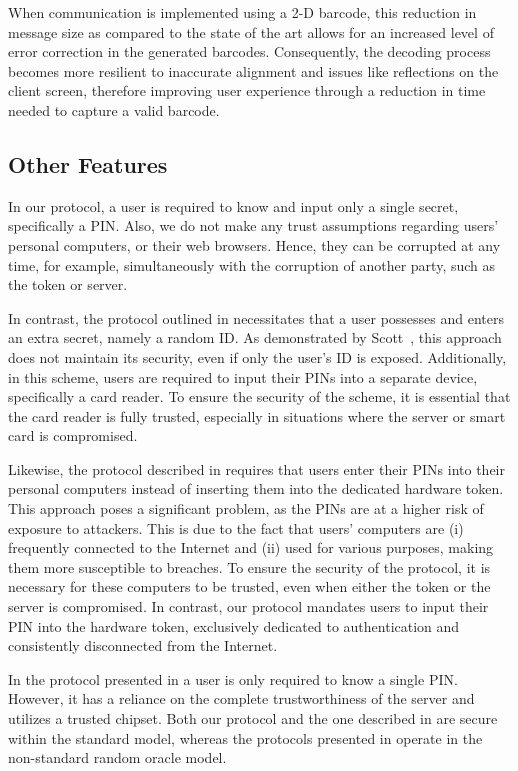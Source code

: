 When communication is implemented using a 2-D barcode, this reduction in message size as compared to the state of the art allows for an increased level of error correction in the generated barcodes.
Consequently, the decoding process becomes more resilient to inaccurate alignment and issues like reflections on the client screen, therefore improving user experience through a reduction in time needed to capture a valid barcode.


\subsection{Other Features}


In our protocol, a user is required to know and input only a single secret, specifically a PIN. Also, we do not make any trust assumptions regarding users' personal computers, or their web browsers. Hence, they can be corrupted at any time,  for example, simultaneously with the corruption of another party, such as the token or server. 
 
 In contrast, the protocol outlined in \cite{WangW18} necessitates that a user possesses and enters an extra secret, namely a random ID.  As demonstrated by Scott~\cite{Scott12a}, this approach does not maintain its security, even if only the user's ID is exposed. Additionally, in this scheme, users are required to input their PINs into a separate device, specifically a card reader. To ensure the security of the scheme, it is essential that the card reader is fully trusted, especially in situations where the server or smart card is compromised.
 
 
  Likewise, the protocol described in  \cite{JareckiJKSS21} requires that users enter their PINs into their personal computers instead of inserting them into the dedicated hardware token. This approach poses a significant problem, as the PINs are at a higher risk of exposure to attackers. This is due to the fact that users' computers are (i) frequently connected to the Internet and (ii) used for various purposes, making them more susceptible to breaches.
To ensure the security of the protocol, it is necessary for these computers to be trusted, even when either the token or the server is compromised. In contrast, our protocol mandates users to input their PIN into the hardware token, exclusively dedicated to authentication and consistently disconnected from the Internet. 
 
 
 In the protocol presented in \cite{MatsuoMY11} a user is only required to know a single PIN. However, it has a reliance on the complete trustworthiness of the server and utilizes a trusted chipset. Both our protocol and the one described in \cite{MatsuoMY11} are secure within the standard model, whereas the protocols presented in \cite{WangW18,JareckiJKSS21} operate in the non-standard random oracle model. 




